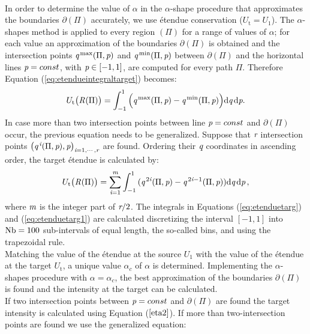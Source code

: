 \\ \indent In order to determine the value of $\alpha$ in the $\alpha$-shape procedure that approximates the boundaries $\partial$$(\Pi)$ accurately, we use \'{e}tendue conservation ($U_{\textrm{t}}= U_1$). The $\alpha$-shapes method is applied to every region $(\Pi)$ for a range of values of $\alpha$;
   for each value an approximation of the boundaries $\partial$$(\Pi)$ is obtained and
   the intersection points $\textit{q}^{\textrm{\,max}}(\Pi,\textit{p})$ and $\textit{q}^{\textrm{\,min}}(\Pi,\textit{p})$ between $\partial$$(\Pi)$
and the horizontal lines $\textit{p}=const$, with $\textit{p}\in[-1,1]$, are computed for every path $\Pi$.
Therefore Equation (\ref{eq:etendueintegraltarget}) becomes:
\begin{equation}\label{eq:etenduetarg}
 U_\textrm{t}\big(\mbox{$\emph{R}_{\textit{}}$}(\Pi)\big)= \int_{-1}^{1}{\Big(\textit{q}^{\textrm{\,max}}(\Pi,\textit{p})-\textit{q}^{\textrm{\,min}}(\Pi,\textit{p})\Big)} \textrm{d}\textit{q}\,\textrm{d}\textit{p}.
\end{equation} In case more than two intersection points between line $\textit{p}=const$ and $\partial$$(\Pi)$ occur, the previous equation needs to be generalized. Suppose that $\textit{r}$ intersection points $\big(\textit{q}^{\,\textit{i}}(\Pi,\textit{p}), \textit{p}\big)_{\textit{i} = 1, \cdots, \textit{r}}$ are found. 
Ordering their $\textit{q}$ coordinates in ascending order, the target \'{e}tendue is calculated by:
\begin{equation}\label{eq:etenduetarg1}
 U_\textrm{t}\big(\mbox{$\emph{R}_{\textit{}}$}(\Pi)\big) = \sum_{\textit{i} = 1}^{\textit{m}}\int_{-1}^{1}
{(\textit{q}^{\,2\textit{i}}(\Pi,\textit{p})}-{\textit{q}^{\,2\textit{i}-1} (\Pi, \textit{p}) )} \textrm{d}\textit{q}\,\textrm{d}\textit{p}\,,
\end{equation}
where $\textit{m}$ is the integer part of $\textit{r}/2$. 
The integrals in Equations (\ref{eq:etenduetarg}) and (\ref{eq:etenduetarg1}) are calculated discretizing the interval $[-1, 1]$
   into $\textrm{Nb}=100$ sub-intervals of equal length, the so-called bins, and using the trapezoidal rule.
\\ \indent Matching the value of the \'{e}tendue at the source $U_1$ with the value of the \'{e}tendue at the target $U_{\textrm{t}}$, a unique value $\alpha_{c}$ of $\alpha$  is determined. Implementing the $\alpha$-shapes procedure with $\alpha = \alpha_c$, the best approximation of the boundaries $\partial$$(\Pi)$ is found and the intensity at the target can be calculated.\\ \indent If two intersection points between $\textit{p}=const$ and $\partial$$(\Pi)$ are found the target intensity is calculated using Equation ($\ref{eta2}$). If more than two-intersection points are found we use the generalized equation:
